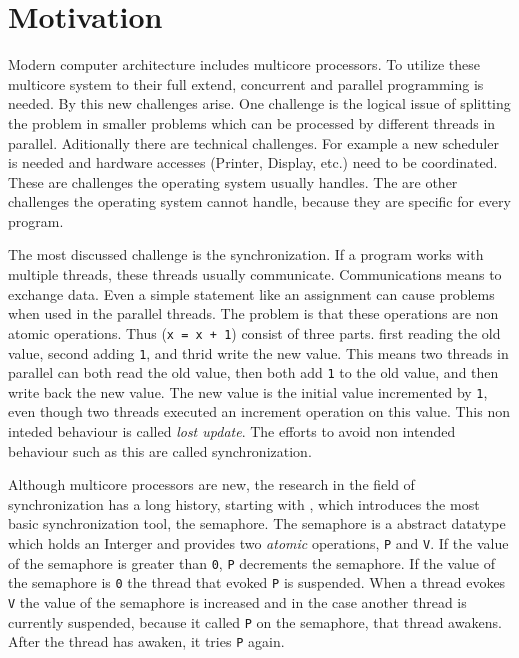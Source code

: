 
\chapter{Motivation} %

\label{Chapter0} %


\newcommand{\keyword}[1]{\textit{#1}}
\newcommand{\tabhead}[1]{\textbf{#1}}
\newcommand{\code}[1]{\texttt{#1}}
\newcommand{\file}[1]{\texttt{\bfseries#1}}
\newcommand{\option}[1]{\texttt{\itshape#1}}

Modern computer architecture includes multicore processors. To utilize these multicore system to their full extend, concurrent and parallel programming is needed.
By this new challenges arise. One challenge is the logical issue of splitting the problem in smaller problems which can be processed by different threads in parallel.
Aditionally there are technical challenges. For example a new scheduler is needed and hardware accesses (Printer, Display, etc.) need to be coordinated. These are challenges
the operating system usually handles. The are other challenges the operating system cannot handle, because they are specific for every program.

The most discussed challenge is the synchronization. If a program works with multiple threads, these threads usually communicate. Communications means to 
exchange data. Even a simple statement like an assignment can cause problems when used in the parallel threads. The problem is that these operations are
non atomic operations. Thus (\code{x = x + 1}) consist of three parts. first reading the old value, second adding \code{1}, and thrid write the new value.
This means two threads in parallel can both read the old value, then both add \code{1} to the old value, and then write back the new value. 
The new value is the initial value incremented by \code{1}, even though two threads executed an increment operation on this value. 
This non inteded behaviour is called \keyword{lost update}. The efforts to avoid non intended behaviour such as this are called synchronization.

Although multicore processors are new, the research in the field of synchronization has a long history, starting with \parencite{semaphore}, which 
introduces the most basic synchronization tool, the semaphore. The semaphore is a abstract datatype which holds an Interger and provides two 
\keyword{atomic} operations, \code{P} and \code{V}. If the value of the semaphore is greater than \code{0}, \code{P} decrements the semaphore. If the value of 
the semaphore is \code{0} the thread that evoked \code{P} is suspended. When a thread evokes \code{V} the value of the semaphore is increased and
in the case another thread is currently suspended, because it called \code{P} on the semaphore, that thread awakens. After the thread has
awaken, it tries \code{P} again. 


